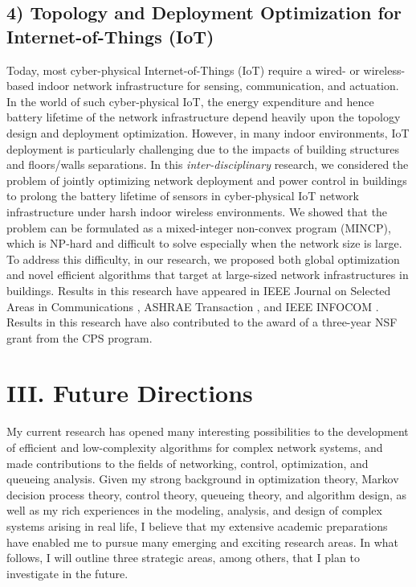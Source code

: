 \documentclass[10pt]{article}
\theoremstyle{plain} \numberwithin{equation}{section}
\theoremstyle{definition}
\begin{document}
\subsection*{4) Topology and Deployment Optimization for Internet-of-Things (IoT) \cite{Liu12:FBS_Infocom,Liu12:FBS_JSAC,Li12:ASHRAE}}
Today, most cyber-physical Internet-of-Things (IoT) require a wired- or wireless-based indoor network infrastructure for sensing, communication, and actuation.
In the world of such cyber-physical IoT, the energy expenditure and hence battery lifetime of the  network infrastructure depend heavily upon the topology design and deployment optimization.
However, in many indoor environments, IoT deployment is particularly challenging due to the impacts of building structures and floors/walls separations.
In this {\em inter-disciplinary} research, we considered the problem of jointly optimizing network deployment and power control in buildings to prolong the battery lifetime of sensors in cyber-physical IoT network infrastructure under harsh indoor wireless environments.
We showed that the problem can be formulated as a mixed-integer non-convex program (MINCP), which is NP-hard and difficult to solve especially when the network size is large.
To address this difficulty, in our research, we proposed both global optimization and novel efficient algorithms that target at large-sized network infrastructures in buildings.
Results in this research have appeared in IEEE Journal on Selected Areas in Communications \cite{Liu12:FBS_JSAC},  ASHRAE Transaction \cite{Li12:ASHRAE}, and IEEE INFOCOM \cite{Liu12:FBS_Infocom}.
Results in this research have also contributed to the award of a three-year NSF grant from the CPS program.


\section*{III. Future Directions}
My current research has opened many interesting possibilities to the development of efficient and low-complexity algorithms for complex network systems, and made contributions to the fields of networking, control, optimization, and queueing analysis.
Given my strong background in optimization theory, Markov decision process theory, control theory, queueing theory, and algorithm design, as well as my rich experiences in the modeling, analysis, and design of complex systems arising in real life, I believe that my extensive academic preparations have enabled me to pursue many emerging and exciting research areas. 
In what follows, I will outline three strategic areas, among others, that I plan to investigate in the future.
\end{document}
